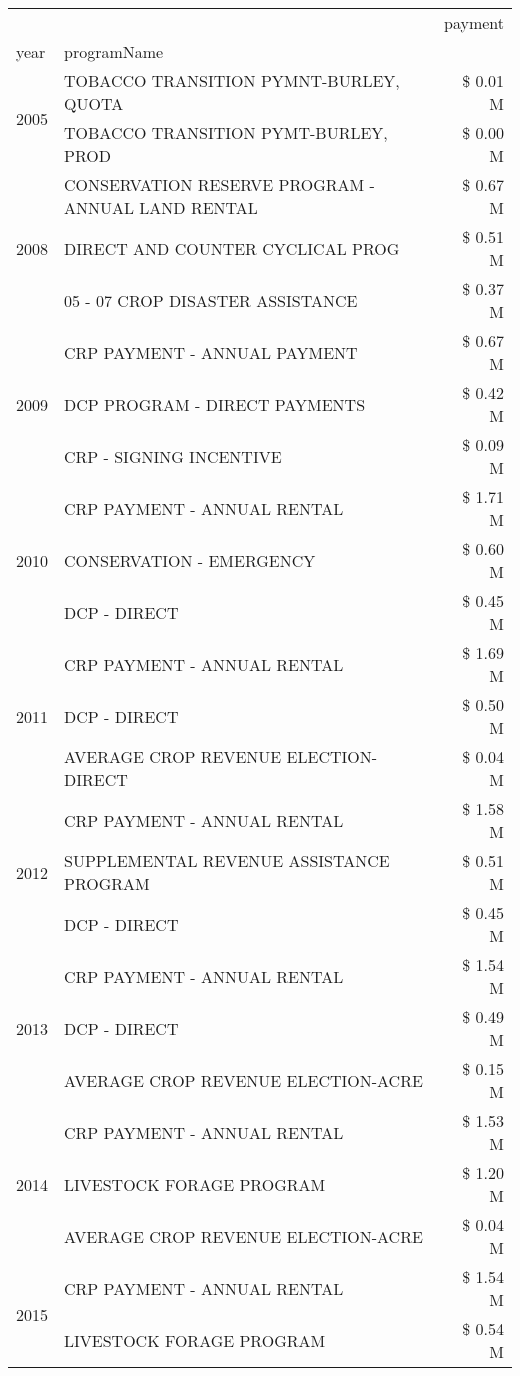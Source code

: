 \begin{tabular}{llr}
\toprule
 &  & payment \\
year & programName &  \\
\midrule
\multirow[t]{2}{*}{2005} & TOBACCO TRANSITION PYMNT-BURLEY, QUOTA & \$ 0.01 M \\
 & TOBACCO TRANSITION PYMT-BURLEY, PROD & \$ 0.00 M \\
\cline{1-3}
\multirow[t]{3}{*}{2008} & CONSERVATION RESERVE PROGRAM - ANNUAL LAND RENTAL & \$ 0.67 M \\
 & DIRECT AND COUNTER CYCLICAL PROG & \$ 0.51 M \\
 & 05 - 07 CROP DISASTER ASSISTANCE & \$ 0.37 M \\
\cline{1-3}
\multirow[t]{3}{*}{2009} & CRP PAYMENT - ANNUAL PAYMENT & \$ 0.67 M \\
 & DCP PROGRAM - DIRECT PAYMENTS & \$ 0.42 M \\
 & CRP - SIGNING INCENTIVE & \$ 0.09 M \\
\cline{1-3}
\multirow[t]{3}{*}{2010} & CRP PAYMENT - ANNUAL RENTAL & \$ 1.71 M \\
 & CONSERVATION - EMERGENCY & \$ 0.60 M \\
 & DCP - DIRECT & \$ 0.45 M \\
\cline{1-3}
\multirow[t]{3}{*}{2011} & CRP PAYMENT - ANNUAL RENTAL & \$ 1.69 M \\
 & DCP - DIRECT & \$ 0.50 M \\
 & AVERAGE CROP REVENUE ELECTION-DIRECT & \$ 0.04 M \\
\cline{1-3}
\multirow[t]{3}{*}{2012} & CRP PAYMENT - ANNUAL RENTAL & \$ 1.58 M \\
 & SUPPLEMENTAL REVENUE ASSISTANCE PROGRAM & \$ 0.51 M \\
 & DCP - DIRECT & \$ 0.45 M \\
\cline{1-3}
\multirow[t]{3}{*}{2013} & CRP PAYMENT - ANNUAL RENTAL & \$ 1.54 M \\
 & DCP - DIRECT & \$ 0.49 M \\
 & AVERAGE CROP REVENUE ELECTION-ACRE & \$ 0.15 M \\
\cline{1-3}
\multirow[t]{3}{*}{2014} & CRP PAYMENT - ANNUAL RENTAL & \$ 1.53 M \\
 & LIVESTOCK FORAGE PROGRAM & \$ 1.20 M \\
 & AVERAGE CROP REVENUE ELECTION-ACRE & \$ 0.04 M \\
\cline{1-3}
\multirow[t]{3}{*}{2015} & CRP PAYMENT - ANNUAL RENTAL & \$ 1.54 M \\
 & LIVESTOCK FORAGE PROGRAM & \$ 0.54 M \\

\end{tabular}
